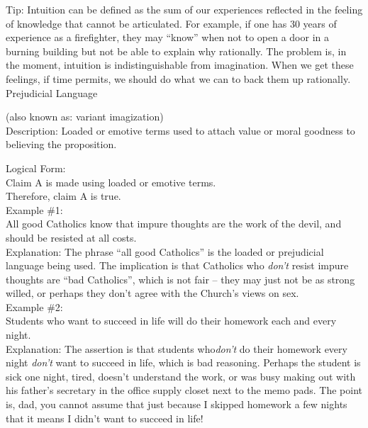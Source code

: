 \documentclass[a4paper,12pt,single,pdftex]{scrbook}
\begin{document}
    
      Tip: Intuition can be defined as the sum of our experiences reflected in the feeling of knowledge that cannot be articulated. For example, if one has 30 years of experience as a firefighter, they may “know” when not to open a door in a burning building but not be able to explain why rationally. The problem is, in the moment, intuition is indistinguishable from imagination. When we get these feelings, if time permits, we should do what we can to back them up rationally.
    \\

  

Prejudicial Language
    
      (also known as: variant imagization)
    \\

  
    Description: Loaded or emotive terms used to attach value or moral goodness to believing the proposition.

    
      Logical Form:
    \\

    
      Claim A is made using loaded or emotive terms.
    \\

    
      Therefore, claim A is true.
    \\

    
      Example \#1:
    \\

    
      All good Catholics know that impure thoughts are the work of the devil, and should be resisted at all costs.
    \\

    
      Explanation: The phrase “all good Catholics” is the loaded or prejudicial language being used.  The implication is that Catholics who {\it don’t}  resist impure thoughts are “bad Catholics”, which is not fair -- they may just not be as strong willed, or perhaps they don’t agree with the Church's views on sex.
    \\

    
      Example \#2:
    \\

    
      Students who want to succeed in life will do their homework each and every night.
    \\

    
      Explanation: The assertion is that students who{\it  don’t}  do their homework every night {\it don’t} want to succeed in life, which is bad reasoning.  Perhaps the student is sick one night, tired, doesn’t understand the work, or was busy making out with his father’s secretary in the office supply closet next to the memo pads.  The point is, dad, you cannot assume that just because I skipped homework a few nights that it means I didn’t want to succeed in life!
    \\
\end{document}
